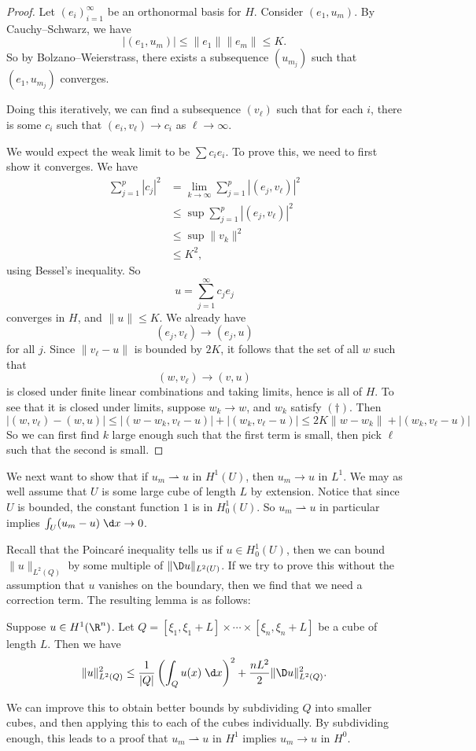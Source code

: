 \documentclass[a4paper]{article}
\begin{document}
\begin{proof}
  Let $(e_i)_{i = 1}^\infty$ be an orthonormal basis for $H$. Consider $(e_1, u_m)$. By Cauchy--Schwarz, we have
  \[
    |(e_1, u_m)| \leq \|e_1\| \|e_m\| \leq K.
  \]
  So by Bolzano--Weierstrass, there exists a subsequence $(u_{m_j})$ such that $(e_1, u_{m_j})$ converges.

  Doing this iteratively, we can find a subsequence $(v_\ell)$ such that for each $i$, there is some $c_i$ such that $(e_i, v_\ell) \to c_i$ as $\ell \to \infty$.

  We would expect the weak limit to be $\sum c_i e_i$. To prove this, we need to first show it converges. We have
  \begin{align*}
    \sum_{j = 1}^p |c_j|^2 &= \lim_{k \to \infty} \sum_{j = 1}^p |(e_j, v_\ell)|^2\\
    &\leq \sup \sum_{j = 1}^p |(e_j, v_\ell)|^2\\
    &\leq \sup \|v_k\|^2\\
    &\leq K^2,
  \end{align*}
  using Bessel's inequality. So
  \[
    u = \sum_{j = 1}^\infty c_j e_j
  \]
  converges in $H$, and $\|u\| \leq K$. We already have
  \[
    (e_j, v_{\ell}) \to (e_j, u)
  \]
  for all $j$. Since $\|v_\ell - u\|$ is bounded by $2K$, it follows that the set of all $w$ such that
  \[
    (w, v_\ell) \to (v, u)\tag{$\dagger$}
  \]
  is closed under finite linear combinations and taking limits, hence is all of $H$. To see that it is closed under limits, suppose $w_k \to w$, and $w_k$ satisfy $(\dagger)$. Then
  \[
    |(w, v_\ell) - (w, u)| \leq |(w - w_k, v_\ell - u)| + |(w_k, v_\ell - u)| \leq 2K \|w - w_k\| + |(w_k, v_\ell - u)|
  \]
  So we can first find $k$ large enough such that the first term is small, then pick $\ell$ such that the second is small.
\end{proof}

We next want to show that if $u_m \rightharpoonup u$ in $H^1(U)$, then $u_m \to u$ in $L^1$. We may as well assume that $U$ is some large cube of length $L$ by extension. Notice that since $U$ is bounded, the constant function $1$ is in $H_0^1(U)$. So $u_m \rightharpoonup u$ in particular implies $\int_U (u_m - u)\;\d x \to 0$.

Recall that the Poincar\'e inequality tells us if $u \in H_0^1(U)$, then we can bound $\|u\|_{L^2(Q)}$ by some multiple of $\|\D u\|_{L^2(U)}$. If we try to prove this without the assumption that $u$ vanishes on the boundary, then we find that we need a correction term. The resulting lemma is as follows:
\begin{lemma}
  Suppose $u \in H^1(\R^n)$. Let $Q = [\xi_1, \xi_1 + L] \times \cdots \times [\xi_n , \xi_n + L]$ be a cube of length $L$. Then we have
  \[
    \|u\|_{L^2(Q)}^2 \leq \frac{1}{|Q|} \left(\int_Q u(x) \;\d x\right)^2 + \frac{nL^2}{2} \|\D u\|_{L^2(Q)}^2.
  \]
\end{lemma}
We can improve this to obtain better bounds by subdividing $Q$ into smaller cubes, and then applying this to each of the cubes individually. By subdividing enough, this leads to a proof that $u_m \rightharpoonup u$ in $H^1$ implies $u_m \to u$ in $H^0$.
\end{document}
